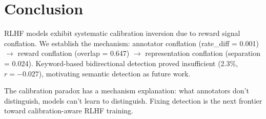 \section{Conclusion}

RLHF models exhibit systematic calibration inversion due to reward signal conflation. We establish the mechanism: annotator conflation (rate\_diff = 0.001) $\rightarrow$ reward conflation (overlap = 0.647) $\rightarrow$ representation conflation (separation = 0.024). Keyword-based bidirectional detection proved insufficient (2.3\%, $r = -0.027$), motivating semantic detection as future work.

The calibration paradox has a mechanism explanation: what annotators don't distinguish, models can't learn to distinguish. Fixing detection is the next frontier toward calibration-aware RLHF training.
